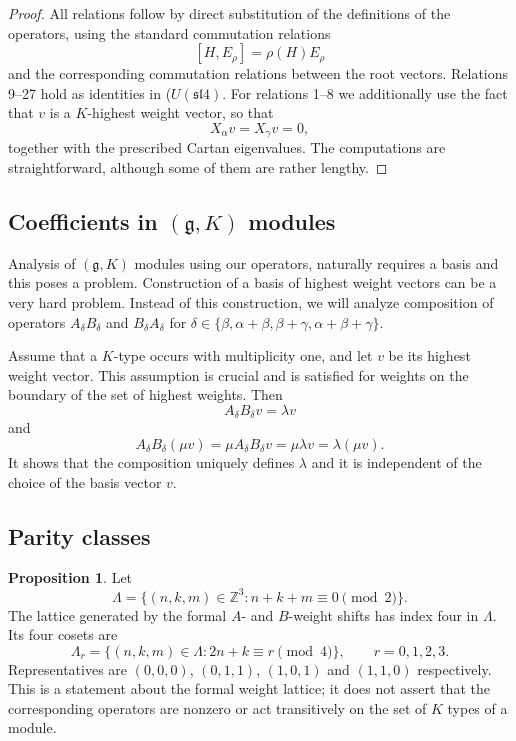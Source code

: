 \documentclass[twoside,a4paper,12pt]{article}
\newcommand{\g}{\ensuremath{\mathfrak g}}
\theoremstyle{definition}
\newtheorem{proposition}{Proposition}
\begin{document}
\begin{proof}
	All relations follow by direct substitution of the definitions of the
	operators, using the standard commutation relations
	\[ [H,E_\rho]=\rho(H)E_\rho \]
	and the corresponding commutation relations between the root vectors.
	Relations 9--27 hold as identities in ($U(\mathfrak{sl}4)$. For relations
	1--8 we additionally use the fact that $v$ is a $K$-highest weight vector,
	so that
	\[ X_\alpha v=X_\gamma v=0, \]
	together with the prescribed Cartan eigenvalues. The computations are straightforward, although some of them are rather lengthy.
\end{proof}

\subsection{\texorpdfstring{Coefficients in $(\g,K)$ modules}
	{Coefficients in (g,K) modules}}\label{coef}

Analysis of $(\g,K)$ modules using our operators, naturally requires a basis
and this poses a problem. Construction of a basis of highest weight vectors can
be a very hard problem. Instead of this construction, we will analyze
composition of operators $A_\delta B_\delta$ and $B_\delta A_\delta$ for
$\delta\in\{\beta,\alpha+\beta,\beta+\gamma,\alpha+\beta+\gamma\}$.

Assume that a $K$-type occurs with multiplicity one, and let $v$ be its highest
weight vector. This assumption is crucial and is satisfied for weights on the
boundary of the set of highest weights. Then
\begin{equation}\label{coefdef}
	A_\delta B_\delta v=\lambda v
\end{equation}
and
\[ A_\delta B_\delta(\mu v)=\mu A_\delta B_\delta v=
	\mu\lambda v=\lambda(\mu v). \]
It shows that the composition uniquely defines $\lambda$ and it is
independent of the choice of the basis vector $v$.

\subsection{Parity classes}

\begin{proposition}\label{parity}
	Let
	\[ \Lambda=\{(n,k,m)\in\mathbb Z^3:n+k+m\equiv0\pmod2\}. \]
	The lattice generated by the formal $A$- and $B$-weight shifts has index
	four in $\Lambda$.  Its four cosets are
	\[ \Lambda_r=\{(n,k,m)\in\Lambda:2n+k\equiv r\pmod4\},\qquad r=0,1,2,3. \]
	Representatives are $(0,0,0)$, $(0,1,1)$, $(1,0,1)$ and $(1,1,0)$
	respectively.  This is a statement about the formal weight lattice; it does
	not assert that the corresponding operators are nonzero or act transitively
	on the set of $K$ types of a module.
\end{proposition}
\end{document}
